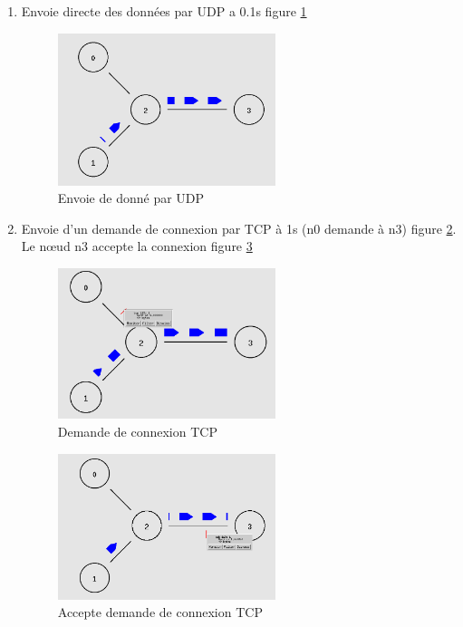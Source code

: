 \documentclass[11pt]{article}
\begin{document}
\begin{enumerate}
	\item Envoie directe des données par UDP a 0.1s figure \ref{EnvoieUDP}
	
\begin{figure}[H]
	\begin{center}
		\includegraphics[width=0.6\textwidth]{assets/tp1/envoieDonneUDP.png}
	\end{center}
	\caption{Envoie de donné par UDP}
	\label{EnvoieUDP}
\end{figure}

	\item Envoie d'un demande de connexion par TCP à 1s (n0 demande à n3) figure \ref{demandeCo}. Le nœud n3 accepte la connexion figure \ref{acceptCo}
	
\begin{figure}[H]
	\begin{center}
		\includegraphics[width=0.6\textwidth]{assets/tp1/demandeDeCo.png}
	\end{center}
	\caption{Demande de connexion TCP}
	\label{demandeCo}
\end{figure}

\begin{figure}[H]
	\begin{center}
		\includegraphics[width=0.6\textwidth]{assets/tp1/accepteCo.png}
	\end{center}
	\caption{Accepte demande de connexion TCP}
	\label{acceptCo}
\end{figure}


\end{enumerate}
\end{document}

